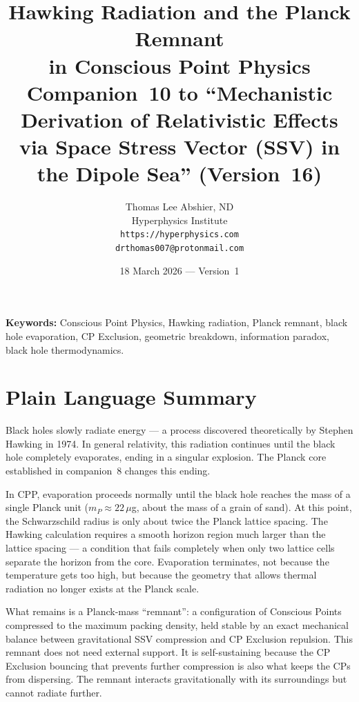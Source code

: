 \documentclass[12pt]{article}
\title{\textbf{Hawking Radiation and the Planck Remnant\\
in Conscious Point Physics}\\[6pt]
{\large Companion~10 to ``Mechanistic Derivation of Relativistic Effects\\
via Space Stress Vector (SSV) in the Dipole Sea'' (Version~16)}}
\author{Thomas Lee Abshier, ND\\
Hyperphysics Institute\\
\texttt{https://hyperphysics.com}\\
\texttt{drthomas007@protonmail.com}}
\date{18 March 2026 --- Version~1}
\begin{document}
\maketitle

\noindent\textbf{Keywords:} Conscious Point Physics, Hawking radiation,
Planck remnant, black hole evaporation, CP Exclusion, geometric breakdown,
information paradox, black hole thermodynamics.

\section*{Plain Language Summary}

Black holes slowly radiate energy — a process discovered theoretically
by Stephen Hawking in 1974.  In general relativity, this radiation
continues until the black hole completely evaporates, ending in a
singular explosion.  The Planck core established in companion~8 changes
this ending.

In CPP, evaporation proceeds normally until the black hole reaches the
mass of a single Planck unit ($m_P \approx 22\,\mu$g, about the mass
of a grain of sand).  At this point, the Schwarzschild radius is only
about twice the Planck lattice spacing.  The Hawking calculation requires
a smooth horizon region much larger than the lattice spacing — a condition
that fails completely when only two lattice cells separate the horizon
from the core.  Evaporation terminates, not because the temperature
gets too high, but because the geometry that allows thermal radiation
no longer exists at the Planck scale.

What remains is a Planck-mass ``remnant'': a configuration of Conscious
Points compressed to the maximum packing density, held stable by
an exact mechanical balance between gravitational SSV compression and
CP Exclusion repulsion.  This remnant does not need external support.
It is self-sustaining because the CP Exclusion bouncing that prevents
further compression is also what keeps the CPs from dispersing.
The remnant interacts gravitationally with its surroundings but cannot
radiate further.
\end{document}
